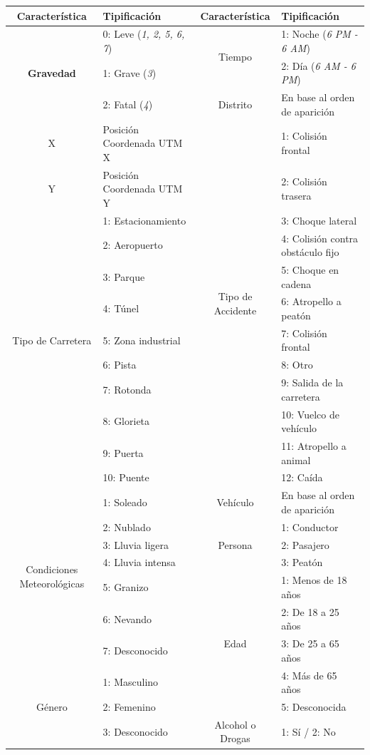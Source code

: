 \documentclass{uathesis-es}
\begin{document}
{\begin{table}[ht]
			\begin{tabular}{|c|l|c|l|}\hline
				\textbf{Característica} & \textbf{Tipificación} & \textbf{Característica} & \textbf{Tipificación} \\ \hline
				\multirow{3}{*}{\textbf{Gravedad}} & 0: Leve (\textit{1, 2, 5, 6, 7}) & \multirow{2}{*}{Tiempo} & 1: Noche (\textit{6 PM - 6 AM}) \\
				& 1: Grave (\textit{3}) & & 2: Día (\textit{6 AM - 6 PM}) \\ \cline{3-4}
				& 2: Fatal (\textit{4}) & Distrito & En base al orden de aparición \\ \hline
				\multirow{1}{*}{X} & Posición Coordenada UTM X & \multirow{12}{*}{Tipo de Accidente} & 1: Colisión frontal \\ \cline{1-2}
				\multirow{1}{*}{Y} & Posición Coordenada UTM Y & & 2: Colisión trasera \\ \cline{1-2}
				\multirow{9}{*}{Tipo de Carretera} & 1: Estacionamiento & & 3: Choque lateral \\
				& 2: Aeropuerto & & 4: Colisión contra obstáculo fijo \\
				& 3: Parque & & 5: Choque en cadena \\
				& 4: Túnel & & 6: Atropello a peatón \\
				& 5: Zona industrial & & 7: Colisión frontal \\
				& 6: Pista & & 8: Otro \\
				& 7: Rotonda & & 9: Salida de la carretera \\
				& 8: Glorieta & & 10: Vuelco de vehículo \\
				& 9: Puerta & & 11: Atropello a animal \\
				& 10: Puente & & 12: Caída \\ \hline
				\multirow{7}{*}{Condiciones Meteorológicas} & 1: Soleado & \multirow{1}{*}{Vehículo} & En base al orden de aparición \\ \cline{3-4}
				& 2: Nublado & \multirow{3}{*}{Persona} & 1: Conductor \\
				& 3: Lluvia ligera & & 2: Pasajero \\
				& 4: Lluvia intensa & & 3: Peatón \\ \cline{3-4}
				& 5: Granizo & \multirow{5}{*}{Edad} & 1: Menos de 18 años \\
				& 6: Nevando & & 2: De 18 a 25 años \\
				& 7: Desconocido & & 3: De 25 a 65 años \\ \cline{1-2}
				\multirow{3}{*}{Género} & 1: Masculino & & 4: Más de 65 años \\
				& 2: Femenino & & 5: Desconocida \\ \cline{3-4}
				& 3: Desconocido & \multirow{1}{*}{Alcohol o Drogas} & 1: Sí / 2: No\\ \hline
			\end{tabular}
			

\end{table}}
\end{document}

